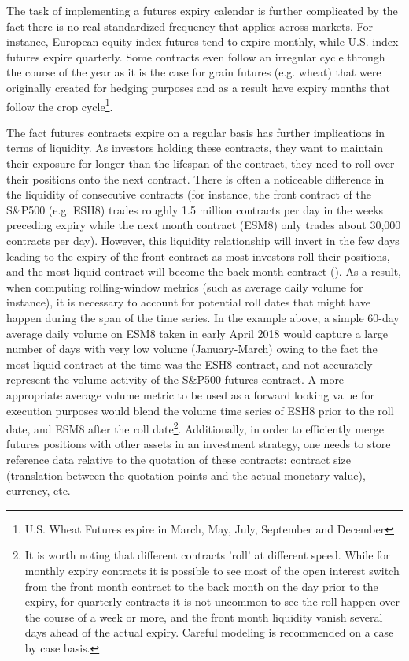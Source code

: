 \begin{itemize}
The task of implementing a futures expiry calendar is further complicated by the fact there is no real standardized frequency that applies across markets. For instance, European equity index futures tend to expire monthly, while U.S. index futures expire quarterly. Some contracts even follow an irregular cycle through the course of the year as it is the case for grain futures (e.g. wheat) that were originally created for hedging purposes and as a result have expiry months that follow the crop cycle\footnote{U.S. Wheat Futures expire in March, May, July, September and December}.


The fact futures contracts expire on a regular basis has further implications in terms of liquidity. As investors holding these contracts, they want to maintain their exposure for longer than the lifespan of the contract, they need to roll over their positions onto the next contract. There is often a noticeable difference in the liquidity of consecutive contracts (for instance, the front contract of the S\&P500 (e.g. ESH8) trades roughly 1.5 million contracts per day in the weeks preceding expiry while the next month contract (ESM8) only trades about 30,000 contracts per day). However, this liquidity relationship will invert in the few days leading to the expiry of the front contract as most investors roll their positions, and the most liquid contract will become the back month contract (). As a result, when computing rolling-window metrics (such as average daily volume for instance), it is necessary to account for potential roll dates that might have happen during the span of the time series. In the example above, a simple 60-day average daily volume on ESM8 taken in early April 2018 would capture a large number of days with very low volume (January-March) owing to the fact the most liquid contract at the time was the ESH8 contract, and not accurately represent the volume activity of the S\&P500 futures contract. A more appropriate average volume metric to be used as a forward looking value for execution purposes would blend the volume time series of ESH8 prior to the roll date, and ESM8 after the roll date\footnote{It is worth noting that different contracts 'roll' at different speed. While for monthly expiry contracts it is possible to see most of the open interest switch from the front month contract to the back month on the day prior to the expiry, for quarterly contracts it is not uncommon to see the roll happen over the course of a week or more, and the front month liquidity vanish several days ahead of the actual expiry. Careful modeling is recommended on a case by case basis.}. Additionally, in order to efficiently merge futures positions with other assets in an investment strategy, one needs to store reference data relative to the quotation of these contracts: contract size (translation between the quotation points and the actual monetary value), currency, etc. 



\end{itemize}
